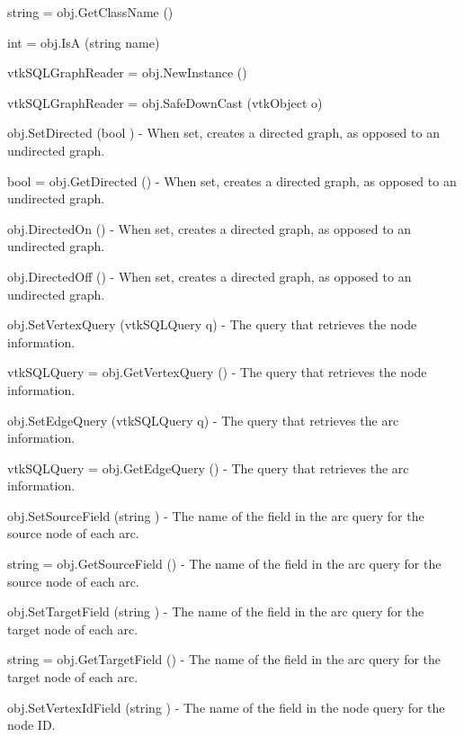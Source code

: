 \begin{DoxyItemize}
\item {\ttfamily string = obj.\-Get\-Class\-Name ()}  
\item {\ttfamily int = obj.\-Is\-A (string name)}  
\item {\ttfamily vtk\-S\-Q\-L\-Graph\-Reader = obj.\-New\-Instance ()}  
\item {\ttfamily vtk\-S\-Q\-L\-Graph\-Reader = obj.\-Safe\-Down\-Cast (vtk\-Object o)}  
\item {\ttfamily obj.\-Set\-Directed (bool )} -\/ When set, creates a directed graph, as opposed to an undirected graph.  
\item {\ttfamily bool = obj.\-Get\-Directed ()} -\/ When set, creates a directed graph, as opposed to an undirected graph.  
\item {\ttfamily obj.\-Directed\-On ()} -\/ When set, creates a directed graph, as opposed to an undirected graph.  
\item {\ttfamily obj.\-Directed\-Off ()} -\/ When set, creates a directed graph, as opposed to an undirected graph.  
\item {\ttfamily obj.\-Set\-Vertex\-Query (vtk\-S\-Q\-L\-Query q)} -\/ The query that retrieves the node information.  
\item {\ttfamily vtk\-S\-Q\-L\-Query = obj.\-Get\-Vertex\-Query ()} -\/ The query that retrieves the node information.  
\item {\ttfamily obj.\-Set\-Edge\-Query (vtk\-S\-Q\-L\-Query q)} -\/ The query that retrieves the arc information.  
\item {\ttfamily vtk\-S\-Q\-L\-Query = obj.\-Get\-Edge\-Query ()} -\/ The query that retrieves the arc information.  
\item {\ttfamily obj.\-Set\-Source\-Field (string )} -\/ The name of the field in the arc query for the source node of each arc.  
\item {\ttfamily string = obj.\-Get\-Source\-Field ()} -\/ The name of the field in the arc query for the source node of each arc.  
\item {\ttfamily obj.\-Set\-Target\-Field (string )} -\/ The name of the field in the arc query for the target node of each arc.  
\item {\ttfamily string = obj.\-Get\-Target\-Field ()} -\/ The name of the field in the arc query for the target node of each arc.  
\item {\ttfamily obj.\-Set\-Vertex\-Id\-Field (string )} -\/ The name of the field in the node query for the node I\-D.  

\end{DoxyItemize}
